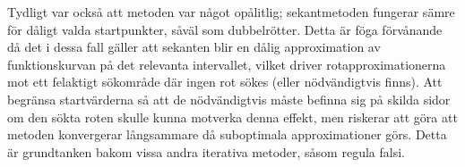 \documentclass[12pt]{article}
\begin{document}
Tydligt var också att metoden var något opålitlig; sekantmetoden fungerar sämre för dåligt valda startpunkter, såväl som dubbelrötter. Detta är föga förvånande då det i dessa fall gäller att sekanten blir en dålig approximation av funktionskurvan på det relevanta intervallet, vilket driver rotapproximationerna mot ett felaktigt sökområde där ingen rot sökes (eller nödvändigtvis finns). Att begränsa startvärderna så att de nödvändigtvis måste befinna sig på skilda sidor om den sökta roten skulle kunna motverka denna effekt, men riskerar att göra att metoden konvergerar långsammare då suboptimala approximationer görs. Detta är grundtanken bakom vissa andra iterativa metoder, såsom regula falsi.
\end{document}
